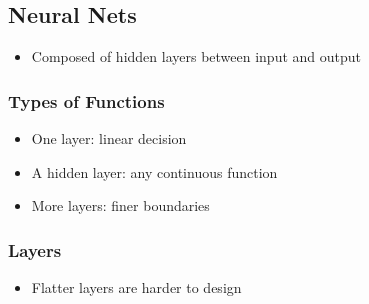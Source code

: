   \subsection{Neural Nets}

    \begin{itemize}
      \item Composed of hidden layers between input and output
    \end{itemize}

    \subsubsection{Types of Functions}

      \begin{itemize}
        \item One layer: linear decision
        \item A hidden layer: any continuous function
        \item More layers: finer boundaries
      \end{itemize}

    \subsubsection{Layers}

      \begin{itemize}
        \item Flatter layers are harder to design
      \end{itemize}